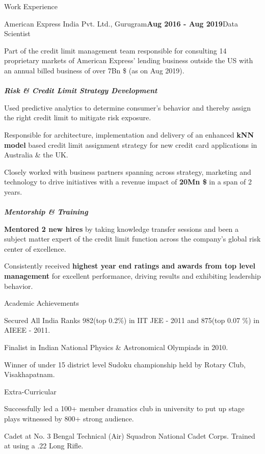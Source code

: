 \documentclass{resume}
\begin{document}
\begin{rSection}{Work Experience}
\begin{rSubsection}{\large American Express India Pvt. Ltd., Gurugram}{\textbf{\large Aug 2016 - Aug 2019}}{\large Data Scientist}{}
 \item Part of the credit limit management team responsible for consulting 14 proprietary markets of American Express' lending business outside the US with an annual billed business of over 7Bn \$ (as on Aug 2019).\\\\
{\textbf{\textit{Risk \& Credit Limit Strategy Development}}}
 \item Used predictive analytics to determine consumer's behavior and thereby assign the right credit limit to mitigate risk exposure.
 \item Responsible for architecture, implementation and delivery of an enhanced \textbf{kNN model} based credit limit assignment strategy for new credit card applications in Australia \& the UK.
 \item Closely worked with business partners spanning across strategy, marketing and technology to drive initiatives with a revenue impact of \textbf{20Mn \$} in a span of 2 years.\\\\
{\textbf{\textit{Mentorship \& Training}}}
 \item \textbf{Mentored 2 new hires} by taking knowledge transfer sessions and been a subject matter expert of the credit limit function across the company's global risk center of excellence.
  \item Consistently received \textbf{highest year end ratings and awards from top level management} for excellent performance, driving results and exhibiting leadership behavior.
\end{rSubsection}

\end{rSection}
% 
\begin{rSection}{Academic Achievements} 
\item Secured All India Ranks 982(top 0.2\%) in IIT JEE - 2011 and 875(top 0.07 \%) in AIEEE - 2011.
\item Finalist in Indian National Physics \& Astronomical Olympiads in 2010.
\item Winner of under 15 district level Sudoku championship held by Rotary Club, Visakhapatnam.
\end{rSection}

\begin{rSection}{Extra-Curricular} 
\item Successfully led a 100+ member dramatics club in university to put up stage plays witnessed by 800+ strong audience.
\item Cadet at No. 3 Bengal Technical (Air) Squadron National Cadet Corps. Trained at using a .22 Long Rifle.
\end{rSection}
\end{document}
